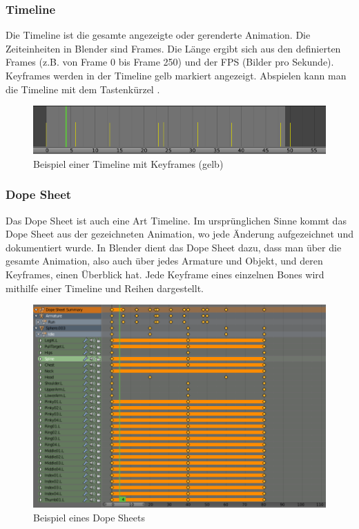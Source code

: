 \subsubsection{Timeline}
Die Timeline ist die gesamte angezeigte oder gerenderte Animation. Die Zeiteinheiten in Blender sind Frames.
Die Länge ergibt sich aus den definierten Frames (z.B. von Frame 0 bis Frame 250) und der FPS (Bilder pro Sekunde).
Keyframes werden in der Timeline gelb markiert angezeigt. Abspielen kann man die Timeline mit dem Tastenkürzel .
\citep{Blender:Timeline}

\begin{figure}[H]
    \centering

    \includegraphics[width=.8\textwidth]{images/animation_timeline.PNG}
    \caption{Beispiel einer Timeline mit Keyframes (gelb)}
\end{figure}

\subsubsection{Dope Sheet}
Das Dope Sheet ist auch eine Art Timeline. Im ursprünglichen Sinne kommt das Dope Sheet aus der gezeichneten Animation,
wo jede Änderung aufgezeichnet und dokumentiert wurde. In Blender dient das Dope Sheet dazu, dass man über die gesamte Animation,
also auch über jedes Armature und Objekt, und deren Keyframes, einen Überblick hat. Jede Keyframe eines einzelnen Bones wird mithilfe einer Timeline und Reihen dargestellt.
\citep{Blender:DopeSheet}

\begin{figure}[H]
    \centering

    \includegraphics[width=.8\textwidth]{images/animation_dope_sheet.PNG}
    \caption{Beispiel eines Dope Sheets}
\end{figure}

